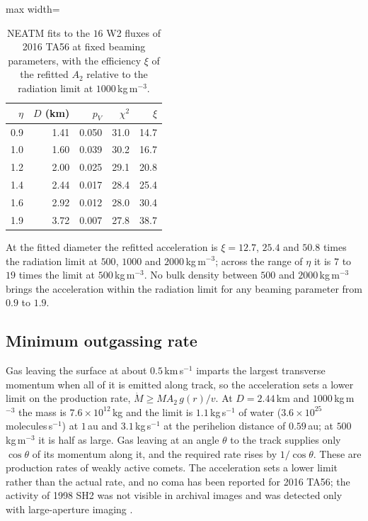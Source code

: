 \documentclass[3p,11pt]{elsarticle}
\begin{document}
\begin{table}[t]
\centering\small
\caption{NEATM fits to the $16$ W2 fluxes of 2016 TA56 at fixed beaming parameters, with
the efficiency $\xi$ of the refitted $A_2$ relative to the radiation limit at
$1000$\,kg\,m$^{-3}$.}
\label{tab:thermal}
\begin{adjustbox}{max width=\textwidth}
\begin{tabular}{rrrrr}
\toprule
$\eta$ & $D$ (km) & $p_V$ & $\chi^2$ & $\xi$ \\
\midrule
0.9 & 1.41 & 0.050 & 31.0 & 14.7 \\
1.0 & 1.60 & 0.039 & 30.2 & 16.7 \\
1.2 & 2.00 & 0.025 & 29.1 & 20.8 \\
1.4 & 2.44 & 0.017 & 28.4 & 25.4 \\
1.6 & 2.92 & 0.012 & 28.0 & 30.4 \\
1.9 & 3.72 & 0.007 & 27.8 & 38.7 \\
\bottomrule
\end{tabular}
\end{adjustbox}
\end{table}

At the fitted diameter the refitted acceleration is $\xi=12.7$, $25.4$ and $50.8$ times
the radiation limit at $500$, $1000$ and $2000$\,kg\,m$^{-3}$; across the range of $\eta$
it is $7$ to $19$ times the limit at $500$\,kg\,m$^{-3}$. No bulk density between $500$
and $2000$\,kg\,m$^{-3}$ brings the acceleration within the radiation limit for any
beaming parameter from $0.9$ to $1.9$.

\subsection{Minimum outgassing rate}

Gas leaving the surface at about $0.5$\,km\,s$^{-1}$ imparts the largest transverse
momentum when all of it is emitted along track, so the acceleration sets a lower limit on
the production rate, $\dot M \ge M A_2\,g(r)/v$. At $D=2.44$\,km and $1000$\,kg\,m$^{-3}$
the mass is $7.6\times10^{12}$\,kg and the limit is $1.1$\,kg\,s$^{-1}$ of water
($3.6\times10^{25}$\,molecules\,s$^{-1}$) at $1$\,au and $3.1$\,kg\,s$^{-1}$ at the
perihelion distance of $0.59$\,au; at $500$\,kg\,m$^{-3}$ it is half as large. Gas
leaving at an angle $\theta$ to the track supplies only $\cos\theta$ of its momentum along
it, and the required rate rises by $1/\cos\theta$. These are production rates of weakly
active comets. The acceleration sets a lower limit rather than
the actual rate, and no coma has been reported for 2016 TA56; the activity of 1998 SH2
was not visible in archival images and was detected only with large-aperture
imaging \citep{Farnocchia2026}.
\end{document}
